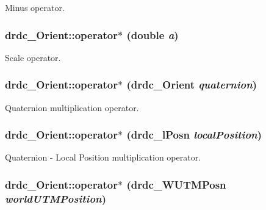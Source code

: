Minus operator. 

\hypertarget{classdrdc__Orient_b02e594d9602ffb25c705a85ac06e7e7}{
\subsubsection[operator$\ast$]{ drdc\_\-Orient::operator$\ast$ (double {\em a})}}
\label{classdrdc__Orient_b02e594d9602ffb25c705a85ac06e7e7}


Scale operator. 

\hypertarget{classdrdc__Orient_44b796fac3437db7577aa159d25e5bff}{
\subsubsection[operator$\ast$]{ drdc\_\-Orient::operator$\ast$ ({\bf drdc\_\-Orient} {\em quaternion})}}
\label{classdrdc__Orient_44b796fac3437db7577aa159d25e5bff}


Quaternion multiplication operator. 

\hypertarget{classdrdc__Orient_229d6497cdf1bc758d5b865252f6e47e}{
\subsubsection[operator$\ast$]{ drdc\_\-Orient::operator$\ast$ ({\bf drdc\_\-lPosn} {\em localPosition})}}
\label{classdrdc__Orient_229d6497cdf1bc758d5b865252f6e47e}


Quaternion - Local Position multiplication operator. 

\hypertarget{classdrdc__Orient_aaf289ae2f9164e2c4cae8e2df7e5bf4}{
\subsubsection[operator$\ast$]{ drdc\_\-Orient::operator$\ast$ ({\bf drdc\_\-WUTMPosn} {\em worldUTMPosition})}}
\label{classdrdc__Orient_aaf289ae2f9164e2c4cae8e2df7e5bf4}


